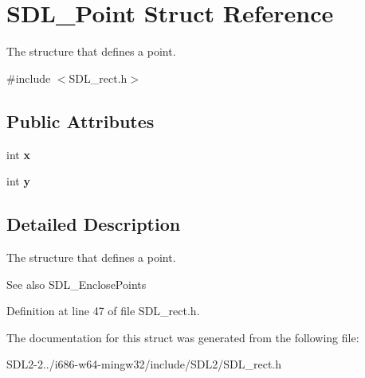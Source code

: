 \hypertarget{structSDL__Point}{\section{S\+D\+L\+\_\+\+Point Struct Reference}
\label{structSDL__Point}
}


The structure that defines a point.  




{\ttfamily \#include $<$S\+D\+L\+\_\+rect.\+h$>$}

\subsection*{Public Attributes}
\begin{DoxyCompactItemize}
\item 
\hypertarget{structSDL__Point_a2ee987d59888024771c8d83aec43056c}{int {\bfseries x}}\label{structSDL__Point_a2ee987d59888024771c8d83aec43056c}

\item 
\hypertarget{structSDL__Point_aaa68aefa869f6bdf46367a70bd9414b0}{int {\bfseries y}}\label{structSDL__Point_aaa68aefa869f6bdf46367a70bd9414b0}

\end{DoxyCompactItemize}


\subsection{Detailed Description}
The structure that defines a point. 

\begin{DoxySeeAlso}{See also}
S\+D\+L\+\_\+\+Enclose\+Points 
\end{DoxySeeAlso}


Definition at line 47 of file S\+D\+L\+\_\+rect.\+h.



The documentation for this struct was generated from the following file\+:\begin{DoxyCompactItemize}
\item 
S\+D\+L2-\/2../i686-\/w64-\/mingw32/include/\+S\+D\+L2/S\+D\+L\+\_\+rect.\+h\end{DoxyCompactItemize}
